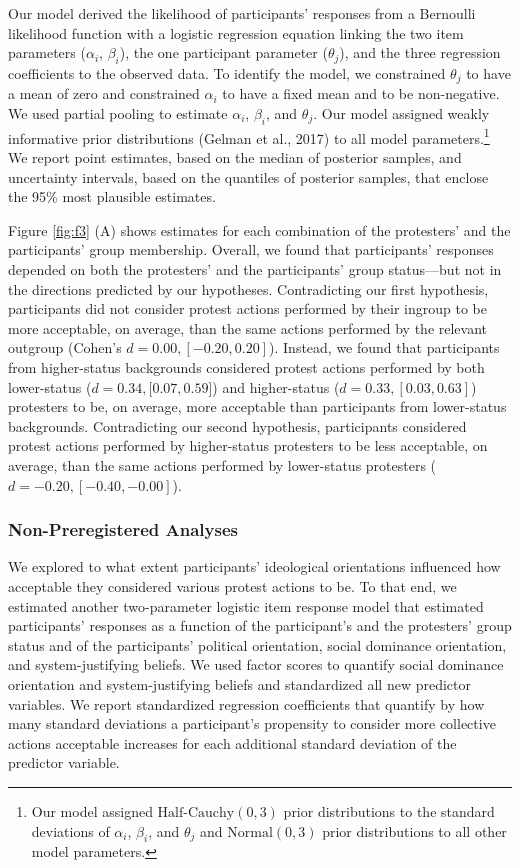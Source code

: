 \documentclass[twocolumn, 11pt, letterpaper]{article}
\begin{document}
Our model derived the likelihood of participants' responses from a
Bernoulli likelihood function with a logistic regression equation
linking the two item parameters (\(\alpha_i\), \(\beta_i\)), the one
participant parameter (\(\theta_j\)), and the three regression
coefficients to the observed data. To identify the model, we constrained
\(\theta_j\) to have a mean of zero and constrained \(\alpha_i\) to have
a fixed mean and to be non-negative. We used partial pooling to estimate
\(\alpha_i\), \(\beta_i\), and \(\theta_j\). Our model assigned weakly
informative prior distributions (Gelman et al., 2017) to all model
parameters.\footnote{Our model assigned \(\text{Half-Cauchy} (0, 3)\)
  prior distributions to the standard deviations of \(\alpha_i\),
  \(\beta_i\), and \(\theta_j\) and \(\text{Normal} (0, 3)\) prior
  distributions to all other model parameters.} We report point
estimates, based on the median of posterior samples, and uncertainty
intervals, based on the quantiles of posterior samples, that enclose the
95\% most plausible estimates.

Figure \ref{fig:f3} (A) shows estimates for each combination of the
protesters' and the participants' group membership. Overall, we found
that participants' responses depended on both the protesters' and the
participants' group status---but not in the directions predicted by our
hypotheses. Contradicting our first hypothesis, participants did not
consider protest actions performed by their ingroup to be more
acceptable, on average, than the same actions performed by the relevant
outgroup (Cohen's \(d = 0.00, [-0.20, 0.20]\)). Instead, we found that
participants from higher-status backgrounds considered protest actions
performed by both lower-status (\(d = 0.34, [0.07, 0.59\){]}) and
higher-status (\(d = 0.33, [0.03, 0.63]\)) protesters to be, on average,
more acceptable than participants from lower-status backgrounds.
Contradicting our second hypothesis, participants considered protest
actions performed by higher-status protesters to be less acceptable, on
average, than the same actions performed by lower-status protesters
(\(d = -0.20, [-0.40, -0.00]\)).

\hypertarget{non-preregistered-analyses}{%
\subsubsection{Non-Preregistered
Analyses}\label{non-preregistered-analyses}}

We explored to what extent participants' ideological orientations
influenced how acceptable they considered various protest actions to be.
To that end, we estimated another two-parameter logistic item response
model that estimated participants' responses as a function of the
participant's and the protesters' group status and of the participants'
political orientation, social dominance orientation, and
system-justifying beliefs. We used factor scores to quantify social
dominance orientation and system-justifying beliefs and standardized all
new predictor variables. We report standardized regression coefficients
that quantify by how many standard deviations a participant's propensity
to consider more collective actions acceptable increases for each
additional standard deviation of the predictor variable.
\end{document}
